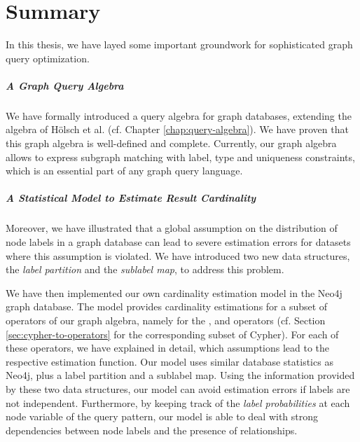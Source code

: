 \chapter{Summary}

In this thesis, we have layed some important groundwork for sophisticated graph
query optimization.

% 

\paragraph{A Graph Query Algebra}

We have formally introduced a query
algebra for graph databases, extending the algebra of Hölsch et al.%
\cite{holsch_algebra_2016} (cf. Chapter \ref{chap:query-algebra}).
We have proven that this graph algebra is well-defined and complete.
Currently, our graph algebra allows to express subgraph matching with label,
type and uniqueness constraints, which is an essential part of any
graph query language.

\paragraph{A Statistical Model to Estimate Result Cardinality}

Moreover, we have illustrated that a global assumption on the distribution of node
labels in a graph database can lead to severe estimation errors for datasets
where this assumption is violated.
We have introduced two new data structures, the \emph{label partition} and the
\emph{sublabel map}, to address this problem.

We have then implemented our own cardinality estimation model in the Neo4j
graph database.
The model provides cardinality estimations for a subset of operators of our
graph algebra, namely for the ,  and
 operators
(cf. Section \ref{sec:cypher-to-operators} for the corresponding subset of
Cypher).
For each of these operators, we have explained in detail, which assumptions
lead to the respective estimation function.
Our model uses similar database statistics as Neo4j, plus a label partition and a
sublabel map. Using the information provided by these two data structures, our
model can avoid estimation errors if labels are not independent.
Furthermore, by keeping track of the \emph{label probabilities} at each node
variable of the query pattern, our model is able to deal with strong
dependencies between node labels and the presence of relationships.

